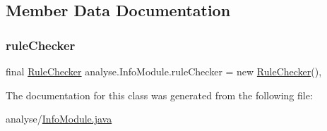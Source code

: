 \subsection{Member Data Documentation}
\mbox{\label{classanalyse_1_1_info_module_a631d23ab7ccd9f448bc34256144f2990}} 
\subsubsection{\texorpdfstring{rule\+Checker}{ruleChecker}}
{\footnotesize\ttfamily final \mbox{\hyperlink{classrule_engine_1_1_rule_checker}{Rule\+Checker}} analyse.\+Info\+Module.\+rule\+Checker = new \mbox{\hyperlink{classrule_engine_1_1_rule_checker}{Rule\+Checker}}()\hspace{0.3cm}{\ttfamily [static]}, {\ttfamily [private]}}



The documentation for this class was generated from the following file\+:\begin{DoxyCompactItemize}
\item 
analyse/\mbox{\hyperlink{_info_module_8java}{Info\+Module.\+java}}\end{DoxyCompactItemize}
